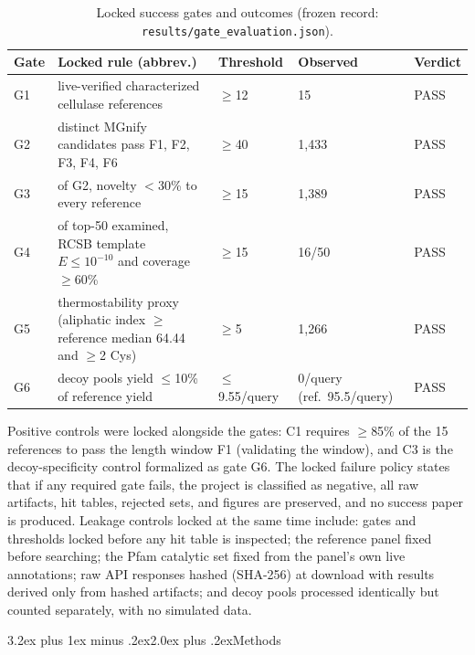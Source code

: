 \documentclass[11pt]{article}
\makeatletter
\renewcommand{\section}{\@startsection{section}{1}{\z@}%
  {3.2ex plus 1ex minus .2ex}{2.0ex plus .2ex}{\Large\bfseries\color{navy}}}
\makeatother
\begin{document}
\begin{table}[h]
\centering\small
{}
\begin{tabular}{|p{0.5cm}|p{7.6cm}|p{2.0cm}|p{2.6cm}|p{1.3cm}|}
\hline
\rowcolor{lightnavy}\textbf{Gate} & \textbf{Locked rule (abbrev.)} & \textbf{Threshold} & \textbf{Observed} & \textbf{Verdict} \\\hline
G1 & live-verified characterized cellulase references & $\ge$12 & 15 & PASS \\\hline
G2 & distinct MGnify candidates pass F1, F2, F3, F4, F6 & $\ge$40 & 1,433 & PASS \\\hline
G3 & of G2, novelty $<$30\% to every reference & $\ge$15 & 1,389 & PASS \\\hline
G4 & of top-50 examined, RCSB template $E\le10^{-10}$ and coverage $\ge$60\% & $\ge$15 & 16/50 & PASS \\\hline
G5 & thermostability proxy (aliphatic index $\ge$ reference median 64.44 and $\ge$2 Cys) & $\ge$5 & 1,266 & PASS \\\hline
G6 & decoy pools yield $\le$10\% of reference yield & $\le$9.55/query & 0/query (ref.\ 95.5/query) & PASS \\\hline
\end{tabular}
\caption{Locked success gates and outcomes (frozen record: \texttt{results/gate\_evaluation.json}).}
\end{table}

Positive controls were locked alongside the gates: C1 requires $\ge$85\% of the 15 references to pass the length window F1 (validating the window), and C3 is the decoy-specificity control formalized as gate G6. The locked failure policy states that if any required gate fails, the project is classified as negative, all raw artifacts, hit tables, rejected sets, and figures are preserved, and no success paper is produced. Leakage controls locked at the same time include: gates and thresholds locked before any hit table is inspected; the reference panel fixed before searching; the Pfam catalytic set fixed from the panel's own live annotations; raw API responses hashed (SHA-256) at download with results derived only from hashed artifacts; and decoy pools processed identically but counted separately, with no simulated data.

\section{Methods}
\end{document}
